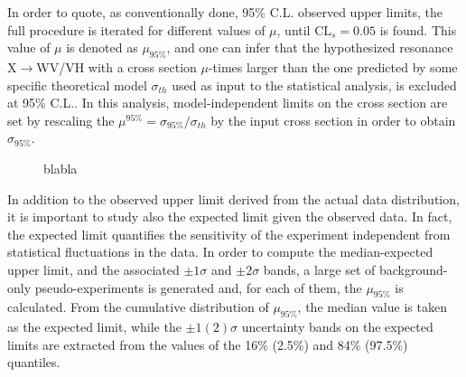 In order to quote, as conventionally done, 95\% C.L. observed upper limits, the full procedure is iterated for different values of $\mu$, until $\mathrm{CL}_s = 0.05$ is found.
This value of $\mu$ is denoted as $\mu_{95\%}$, and one can infer that the hypothesized resonance X$\rightarrow$WV/VH with a cross section $\mu$-times larger than the one predicted 
by some specific theoretical model $\sigma_{th}$ used as input to the statistical analysis, is excluded at 95\% C.L..
In this analysis, model-independent limits on the cross section are set by rescaling the $\mu^{95\%} = \sigma_{95\%}/\sigma_{th}$ by the input cross section in order to obtain $\sigma_{95\%}$.

\begin{figure}[!htb]
\centering
{}
\caption{blabla}
\label{fig:CLs-ex}
\end{figure}

In addition to the observed upper limit derived from the actual data distribution, it is important to study also the expected limit given the observed data.
In fact, the expected limit quantifies the sensitivity of the experiment independent from statistical fluctuations in the data.
In order to compute the median-expected upper limit, and the associated $\pm 1\sigma$ and $\pm 2\sigma$ bands,
a large set of background-only pseudo-experiments is generated and, for each of them, the $\mu_{95\%}$ is calculated.
From the cumulative distribution of $\mu_{95\%}$, the median value is taken as the expected limit, while the $\pm 1(2)\sigma$ uncertainty bands on the expected limits
are extracted from the values of the 16\% (2.5\%) and 84\% (97.5\%) quantiles.

